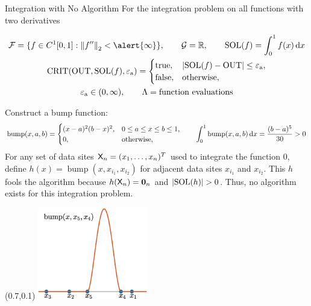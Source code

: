 \documentclass[10pt,compress,xcolor={usenames,dvipsnames},aspectratio=169]{beamer}
\DeclareMathOperator{\BUMP}{bump}
\DeclareMathOperator{\SOL}{SOL}
\DeclareMathOperator{\OUT}{OUT}
\DeclareMathOperator{\CRIT}{CRIT}
\newcommand{\ttrue}{\textup{true}}
\newcommand{\tfalse}{\textup{false}}
\newcommand{\tolabs}{\varepsilon_{\textup{a}}}
\begin{document}
\begin{frame}[fragile, label=integnoalg]{Integration with No Algorithm  \hyperlink{difference}{}}
	\vspace{-4ex}
	For the integration problem on \alert{all functions with two derivatives}
	\vspace{-1ex}
	\begin{minipage}{0.65\textwidth}
		\begin{gather*}
		\cf = \{f \in C^1[0,1] : \norm[2]{f''} < \alert{\infty}\}, \qquad 
		\cg  = \reals,  \qquad
		\SOL(f) = \int_0^1 f(x) \, \dif x  \\
		\CRIT(\OUT, \SOL(f),\tolabs)  = \begin{cases} \ttrue, & \abs{\SOL(f) - \OUT} \le \tolabs, \\
			\tfalse, & \text{otherwise}, 
		\end{cases} \\
		\tolabs \in (0,\infty), \qquad
		\Lambda  = \text{function evaluations}
	\end{gather*}
	\end{minipage}

Construct a bump function:
	\begin{equation*}
		\BUMP(x,a,b) = \begin{cases} (x - a)^2(b-x)^2, & 0 \le a \le x \le b \le 1, \\
			0, & \text{otherwise},
		\end{cases}
	\qquad
	\int_0^1 \BUMP(x,a,b) \, \dif x  =  \frac{(b-a)^5}{30} > 0
	\end{equation*}
For any set of data sites $\mathsf{X}_n = (x_1, \ldots, x_n)^T$ used to integrate the function $0$, define $h(x) = \BUMP(x,x_{i_1}, x_{i_2})$ for adjacent data sites $x_{i_1}$ and $x_{i_2}$.  This $h$ \alert{fools} the algorithm because $h(\mathsf{X}_n) =  \boldsymbol{0}_n$ and $\abs{\SOL(h)} > 0$.  Thus, no algorithm exists for this integration problem.

	\begin{textblock}{0.3}(0.7,0.1)
		\includegraphics[height=4cm]{IntegrationBump.eps}
	\end{textblock}
	
	
\end{frame}
\end{document}
